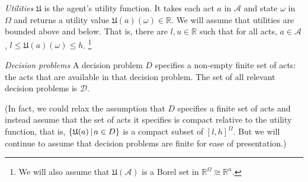 \documentclass[a4paper]{article}
\newcommand\A{\mathcal{A}}
\renewcommand\P{\mathbb{P}} %
\newcommand\EU{\mathrm{EU}}
\newcommand\REU{\mathrm{REU}}
\newcommand\EAd{\mathrm{EAd}}
\newcommand\U{\mathfrak{U}} %
\newcommand\Maximin{\Gamma}
\newcommand{\D}{\mathcal{D}}
\renewcommand\S{\mathcal{S}}
\renewcommand\c{\mathsf{c}} %
\newcommand{\IP}{\P}
\renewcommand{\Re}{\mathbb{R}}
\newcommand{\todoold}[2][]{\todo[backgroundcolor=white,bordercolor=orange!10,linecolor=gray!10, #1,caption={},textcolor=gray]{Pre-rev: #2}}
\newcommand\SetDelimiter[1][]{
	\nonscript\,#1\vert \allowbreak \nonscript\,\mathopen{}}
\providecommand\given{\SetDelimiter}
\renewcommand{\emptyset}{\varnothing}
\renewcommand{\leq}{\leqslant}
\newenvironment{CCM rewritten}
{\begingroup\color{blue}} %
{\endgroup}              %
\begin{document}
 \emph{Utilities } $\U$ is the agent's utility function. It takes each act $a$ in $\A$ and state $\omega$ in $\Omega$ and returns a utility value $\U(a)(\omega)\in\Re$. We will assume that utilities are bounded above and below. That is, there are $l,u\in\Re$ such that for all acts, $a\in\A$, $l\leq \U(a)(\omega)\leq h$.%
 \footnote{We will also assume that $\U(\A)$ is a Borel set in $\Re^\Omega\cong\Re^n$.}

\emph{Decision problems } A decision problem $D$ specifies a non-empty finite set of acts: the acts that are available in that decision problem. The set of all relevant decision problems is $\D$. %

(In fact, we could relax the assumption that $D$ specifies a finite set of acts and instead assume that the set of acts it specifies is compact relative to the utility function, that is, $\{\U(a)\given a \in D\}$ is a compact subset of $[l,h]^\Omega$. But we will continue to assume that decision problems are finite for ease of presentation.)


\end{document}
